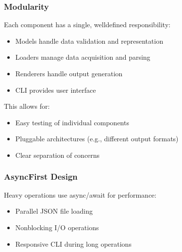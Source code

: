 \documentclass[letterpaper,10pt,english]{sphinxmanual}
\begin{document}
\subsubsection{Modularity}
\label{\detokenize{developer/architecture:modularity}}
\sphinxAtStartPar
Each component has a single, well\sphinxhyphen{}defined responsibility:
\begin{itemize}
\item {} 
\sphinxAtStartPar
Models handle data validation and representation

\item {} 
\sphinxAtStartPar
Loaders manage data acquisition and parsing

\item {} 
\sphinxAtStartPar
Renderers handle output generation

\item {} 
\sphinxAtStartPar
CLI provides user interface

\end{itemize}

\sphinxAtStartPar
This allows for:
\begin{itemize}
\item {} 
\sphinxAtStartPar
Easy testing of individual components

\item {} 
\sphinxAtStartPar
Pluggable architectures (e.g., different output formats)

\item {} 
\sphinxAtStartPar
Clear separation of concerns

\end{itemize}


\subsubsection{Async\sphinxhyphen{}First Design}
\label{\detokenize{developer/architecture:async-first-design}}
\sphinxAtStartPar
Heavy operations use async/await for performance:
\begin{itemize}
\item {} 
\sphinxAtStartPar
Parallel JSON file loading

\item {} 
\sphinxAtStartPar
Non\sphinxhyphen{}blocking I/O operations

\item {} 
\sphinxAtStartPar
Responsive CLI during long operations

\end{itemize}
\end{document}
